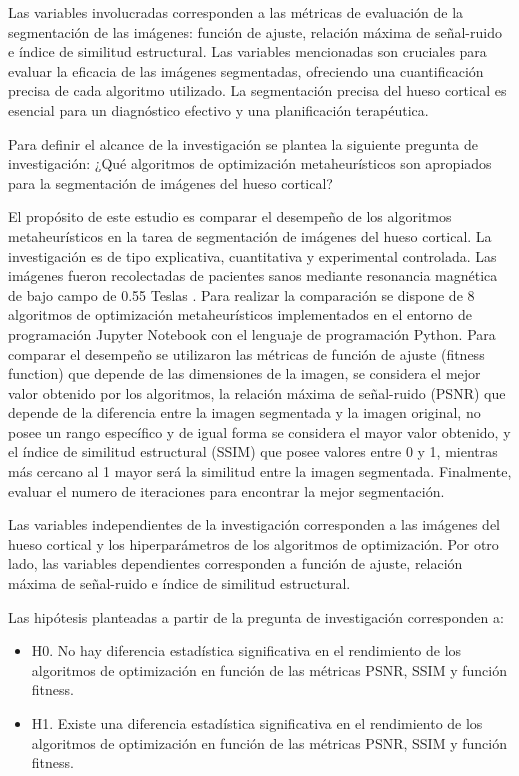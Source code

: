 \documentclass[conference]{IEEEtran}
\begin{document}
\noindent Las variables involucradas corresponden a las métricas de evaluación de la segmentación de las imágenes: función de ajuste, relación máxima de señal-ruido e índice de similitud estructural. Las variables mencionadas son cruciales para evaluar la eficacia de las imágenes segmentadas, ofreciendo una cuantificación precisa de cada algoritmo utilizado. La segmentación precisa del hueso cortical es esencial para un diagnóstico efectivo y una planificación terapéutica.


\noindent Para definir el alcance de la investigación se plantea la siguiente pregunta de investigación: ¿Qué algoritmos de optimización metaheurísticos son apropiados para la segmentación de imágenes del hueso cortical?

\noindent El propósito de este estudio es comparar el desempeño de los algoritmos metaheurísticos en la tarea de segmentación de imágenes del hueso cortical. La investigación es de tipo explicativa, cuantitativa y experimental controlada. Las imágenes fueron recolectadas de pacientes sanos mediante resonancia magnética de bajo campo de 0.55 Teslas . Para realizar la comparación se dispone de 8 algoritmos de optimización metaheurísticos implementados en el entorno de programación Jupyter Notebook con el lenguaje de programación Python. Para comparar el desempeño se utilizaron las métricas de función de ajuste (fitness function) que depende de las dimensiones de la imagen, se considera el mejor valor obtenido por los algoritmos, la relación máxima de señal-ruido (PSNR) que depende de la diferencia entre la imagen segmentada y la imagen original, no posee un rango específico y de igual forma se considera el mayor valor obtenido, y el índice de similitud estructural (SSIM) que posee valores entre 0 y 1, mientras más cercano al 1 mayor será la similitud entre la imagen segmentada. Finalmente, evaluar el numero de iteraciones para encontrar la mejor segmentación.

\noindent Las variables independientes de la investigación corresponden a las imágenes del hueso cortical y los hiperparámetros de los algoritmos de optimización. Por otro lado, las variables dependientes corresponden a  función de ajuste, relación máxima de señal-ruido e índice de similitud estructural.

\noindent Las hipótesis planteadas a partir de la pregunta de investigación corresponden a:
\begin{itemize}
    \item H0. No hay diferencia estadística significativa en el rendimiento de los algoritmos de optimización en función de las métricas PSNR, SSIM y función fitness.
    \item H1. Existe una diferencia estadística significativa en el rendimiento de los algoritmos de optimización en función de las métricas PSNR, SSIM y función fitness.
\end{itemize}
\end{document}
